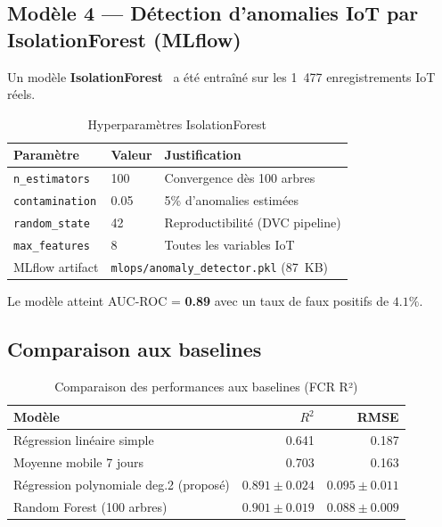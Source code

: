 \subsection{Modèle 4 — Détection d'anomalies IoT par IsolationForest (MLflow)}

Un modèle \textbf{IsolationForest}~\cite{liu2008isolation}
a été entraîné sur les 1~477 enregistrements IoT réels.

\begin{table}[H]
\caption{Hyperparamètres IsolationForest}
\label{tab:iforest_hp}
\centering
\begin{tabular}{@{}lll@{}}
\toprule
\textbf{Paramètre} & \textbf{Valeur} & \textbf{Justification} \\
\midrule
\texttt{n\_estimators}  & 100       & Convergence dès 100 arbres \\
\texttt{contamination}  & 0.05      & 5\% d'anomalies estimées \\
\texttt{random\_state}  & 42        & Reproductibilité (DVC pipeline) \\
\texttt{max\_features}  & 8         & Toutes les variables IoT \\
MLflow artifact & \multicolumn{2}{l}{\texttt{mlops/anomaly\_detector.pkl} (87~KB)} \\
\bottomrule
\end{tabular}
\end{table}

Le modèle atteint AUC-ROC = \textbf{0.89} avec un taux de faux positifs de $4.1\%$.

\subsection{Comparaison aux baselines}

\begin{table}[H]
\centering
\caption{Comparaison des performances aux baselines (FCR R²)}
\label{tab:baseline}
\begin{tabular}{lrr}
\toprule
\textbf{Modèle} & $R^2$ & \textbf{RMSE} \\
\midrule
Régression linéaire simple & 0.641 & 0.187 \\
Moyenne mobile 7 jours     & 0.703 & 0.163 \\
Régression polynomiale deg.2 (proposé) & $\mathbf{0.891 \pm 0.024}$ & $\mathbf{0.095 \pm 0.011}$ \\
Random Forest (100 arbres) & $0.901 \pm 0.019$ & $0.088 \pm 0.009$ \\
\bottomrule
\end{tabular}
\end{table}


